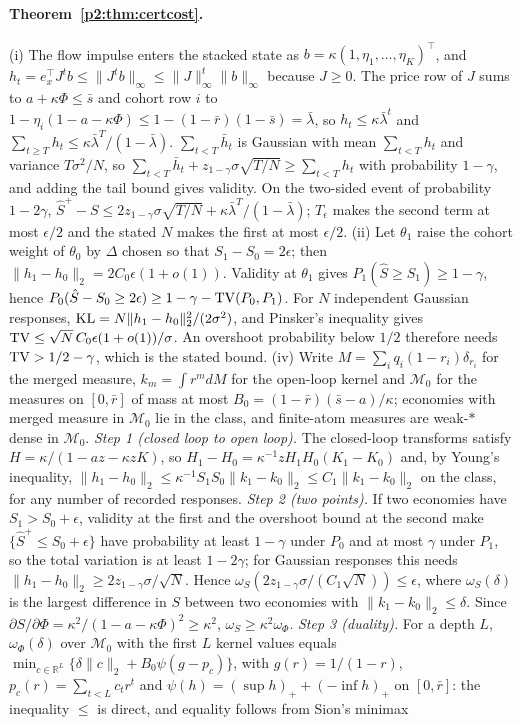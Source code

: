 \paragraph{Theorem~\ref{p2:thm:certcost}.} (i) The flow impulse enters the stacked state as $b=\kappa(1,\eta_1,\ldots,\eta_K)^\top$, and $h_t=e_x^\top J^tb\le\|J^tb\|_\infty\le\|J\|_\infty^t\|b\|_\infty$ because $J\ge0$. The price row of $J$ sums to $a+\kappa\Phi\le\bar s$ and cohort row $i$ to $1-\eta_i(1-a-\kappa\Phi)\le1-(1-\bar r)(1-\bar s)=\bar\lambda$, so $h_t\le\kappa\bar\lambda^t$ and $\sum_{t\ge T}h_t\le\kappa\bar\lambda^T/(1-\bar\lambda)$. $\sum_{t<T}\bar h_t$ is Gaussian with mean $\sum_{t<T}h_t$ and variance $T\sigma^2/N$, so $\sum_{t<T}\bar h_t+z_{1-\gamma}\sigma\sqrt{T/N}\ge\sum_{t<T}h_t$ with probability $1-\gamma$, and adding the tail bound gives validity. On the two-sided event of probability $1-2\gamma$, $\hat S^+-S\le2z_{1-\gamma}\sigma\sqrt{T/N}+\kappa\bar\lambda^T/(1-\bar\lambda)$; $T_\epsilon$ makes the second term at most $\epsilon/2$ and the stated $N$ makes the first at most $\epsilon/2$. (ii) Let $\theta_1$ raise the cohort weight of $\theta_0$ by $\Delta$ chosen so that $S_1-S_0=2\epsilon$; then $\|h_1-h_0\|_2=2C_0\epsilon(1+o(1))$. Validity at $\theta_1$ gives $P_1(\hat S\ge S_1)\ge1-\gamma$, hence $P_0(\hat S-S_0\ge2\epsilon)\ge1-\gamma-{\rm TV}(P_0,P_1)$. For $N$ independent Gaussian responses, ${\rm KL}=N\|h_1-h_0\|_2^2/(2\sigma^2)$, and Pinsker's inequality gives ${\rm TV}\le\sqrt N\,C_0\epsilon(1+o(1))/\sigma$. An overshoot probability below $1/2$ therefore needs ${\rm TV}>1/2-\gamma$, which is the stated bound. (iv) Write $M=\sum_iq_i(1-r_i)\delta_{r_i}$ for the merged measure, $k_m=\int r^m dM$ for the open-loop kernel and $\mathcal M_0$ for the measures on $[0,\bar r]$ of mass at most $B_0=(1-\bar r)(\bar s-a)/\kappa$; economies with merged measure in $\mathcal M_0$ lie in the class, and finite-atom measures are weak-$*$ dense in $\mathcal M_0$. \emph{Step 1 (closed loop to open loop).} The closed-loop transforms satisfy $H=\kappa/(1-az-\kappa zK)$, so $H_1-H_0=\kappa^{-1}zH_1H_0(K_1-K_0)$ and, by Young's inequality, $\|h_1-h_0\|_2\le\kappa^{-1}S_1S_0\|k_1-k_0\|_2\le C_1\|k_1-k_0\|_2$ on the class, for any number of recorded responses. \emph{Step 2 (two points).} If two economies have $S_1>S_0+\epsilon$, validity at the first and the overshoot bound at the second make $\{\hat S^+\le S_0+\epsilon\}$ have probability at least $1-\gamma$ under $P_0$ and at most $\gamma$ under $P_1$, so the total variation is at least $1-2\gamma$; for Gaussian responses this needs $\|h_1-h_0\|_2\ge2z_{1-\gamma}\sigma/\sqrt N$. Hence $\omega_S(2z_{1-\gamma}\sigma/(C_1\sqrt N))\le\epsilon$, where $\omega_S(\delta)$ is the largest difference in $S$ between two economies with $\|k_1-k_0\|_2\le\delta$. Since $\partial S/\partial\Phi=\kappa^2/(1-a-\kappa\Phi)^2\ge\kappa^2$, $\omega_S\ge\kappa^2\omega_\Phi$. \emph{Step 3 (duality).} For a depth $L$, $\omega_\Phi(\delta)$ over $\mathcal M_0$ with the first $L$ kernel values equals $\min_{c\in\mathbb R^L}\{\delta\|c\|_2+B_0\psi(g-p_c)\}$, with $g(r)=1/(1-r)$, $p_c(r)=\sum_{t<L}c_tr^t$ and $\psi(h)=(\sup h)_++(-\inf h)_+$ on $[0,\bar r]$: the inequality $\le$ is direct, and equality follows from Sion's minimax 